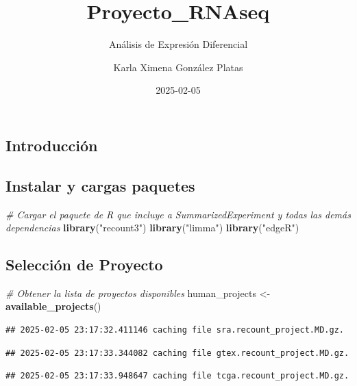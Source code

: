 \documentclass[
]{article}
\title{Proyecto\_RNAseq}
\subtitle{Análisis de Expresión Diferencial}
\author{Karla Ximena González Platas}
\date{2025-02-05}
\newenvironment{Shaded}{\begin{snugshade}}{\end{snugshade}}
\newcommand{\CommentTok}[1]{\textcolor[rgb]{0.56,0.35,0.01}{\textit{#1}}}
\newcommand{\FunctionTok}[1]{\textcolor[rgb]{0.13,0.29,0.53}{\textbf{#1}}}
\newcommand{\NormalTok}[1]{#1}
\newcommand{\OtherTok}[1]{\textcolor[rgb]{0.56,0.35,0.01}{#1}}
\newcommand{\StringTok}[1]{\textcolor[rgb]{0.31,0.60,0.02}{#1}}
\begin{document}
\maketitle

{
\setcounter{tocdepth}{2}
\tableofcontents
}
\subsection{Introducción}\label{introducciuxf3n}

\subsection{Instalar y cargas
paquetes}\label{instalar-y-cargas-paquetes}

\begin{Shaded}
\begin{Highlighting}[]
\CommentTok{\# Cargar el paquete de R que incluye a SummarizedExperiment y todas las demás dependencias}
\FunctionTok{library}\NormalTok{(}\StringTok{"recount3"}\NormalTok{)}
\FunctionTok{library}\NormalTok{(}\StringTok{"limma"}\NormalTok{)}
\FunctionTok{library}\NormalTok{(}\StringTok{"edgeR"}\NormalTok{)}
\end{Highlighting}
\end{Shaded}

\subsection{Selección de Proyecto}\label{selecciuxf3n-de-proyecto}

\begin{Shaded}
\begin{Highlighting}[]
\CommentTok{\# Obtener la lista de proyectos disponibles }
\NormalTok{human\_projects }\OtherTok{\textless{}{-}} \FunctionTok{available\_projects}\NormalTok{()}
\end{Highlighting}
\end{Shaded}

\begin{verbatim}
## 2025-02-05 23:17:32.411146 caching file sra.recount_project.MD.gz.
\end{verbatim}

\begin{verbatim}
## 2025-02-05 23:17:33.344082 caching file gtex.recount_project.MD.gz.
\end{verbatim}

\begin{verbatim}
## 2025-02-05 23:17:33.948647 caching file tcga.recount_project.MD.gz.
\end{verbatim}
\end{document}
